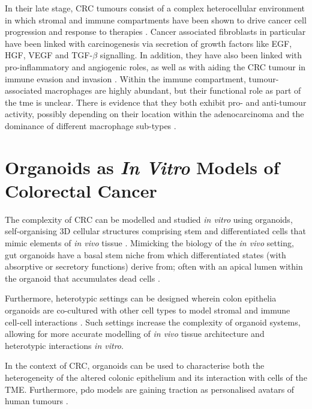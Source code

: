 In their late stage, CRC tumours consist of a complex heterocellular environment in which stromal and immune compartments have been shown to drive cancer cell progression \cite{peddareddigari_tumor_2010,isella_stromal_2015} and response to therapies \cite{tape_heterocellular_2017, toor_immune_2019}.
Cancer associated fibroblasts in particular have been linked with carcinogenesis via secretion of growth factors like EGF, HGF, VEGF and TGF-$\beta$ signalling. In addition, they have also been linked with pro-inflammatory and angiogenic roles, as well as with aiding the CRC tumour in immune evasion and invasion \cite{karagiannis_cancer-associated_2012}.
Within the immune compartment, tumour-associated macrophages are highly abundant, but their functional role as part of the \acrshort{tme} is unclear. There is evidence that they both exhibit pro- and anti-tumour activity, possibly depending on their location within the adenocarcinoma and the dominance of different macrophage sub-types \cite{martinez_m1_2014}. 

\newpage
\section{Organoids as \textit{In Vitro} Models of Colorectal Cancer}

The complexity of CRC can be modelled and studied \emph{in vitro} using organoids, self-organising 3D cellular structures comprising stem and differentiated cells that mimic elements of \emph{in vivo} tissue \cite{huch_modeling_2015,lancaster_disease_2019,almeqdadi_gut_2019}. Mimicking the biology of the \emph{in vivo} setting, gut organoids have a basal stem niche from which differentiated states (with absorptive or secretory functions) derive from; often with an apical lumen within the organoid that accumulates dead cells \cite{sato_single_2009}.

Furthermore, heterotypic settings can be designed wherein colon epithelia organoids are co-cultured with other cell types to model stromal and immune cell-cell interactions \cite{qin_cell-type-specific_2020}. Such settings increase the complexity of organoid systems, allowing for more accurate modelling of \emph{in vivo} tissue architecture and heterotypic interactions \emph{in vitro}. 

In the context of CRC, organoids can be used to characterise both the heterogeneity of the altered colonic epithelium and its interaction with cells of the TME. Furthermore, \acrfull{pdo} models are gaining traction as personalised avatars of human tumours \cite{su_efficacy_2023,zapatero_trellis_2023}.

